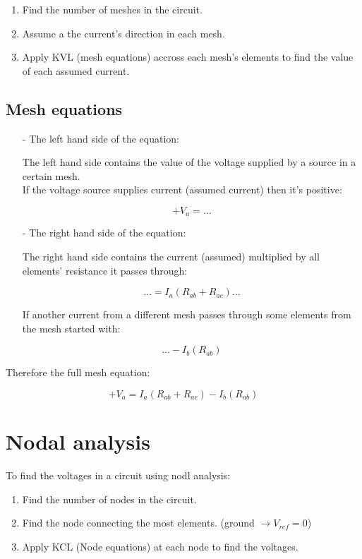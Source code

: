 \documentclass[a4paper]{book}
\begin{document}
\begin{enumerate}

  \item Find the number of meshes in the circuit.
  \item Assume a the current's direction in each mesh.
  \item Apply KVL (mesh equations) accross each mesh's elements to find the value of each assumed current.

\end{enumerate}

\subsection{Mesh equations}

\begin{itemize}

  \item[-] The left hand side of the equation:

    The left hand side contains the value of the voltage supplied by a source in a certain mesh.\\
    If the voltage source supplies current (assumed current) then it's positive:

    \[+V_a = \dots\]

  \item[-] The right hand side of the equation:

    The right hand side contains the current (assumed) multiplied by all elements' resistance it passes through:

    \[\ldots = I_a(R_{ab} + R_{ac}) \ldots\]

    If another current from a different mesh passes through some elements from the mesh started with:

    \[\ldots - I_b(R_{ab})\]

\end{itemize}

Therefore the full mesh equation:

\[+V_a = I_a(R_{ab} + R_{ac}) - I_b(R_{ab})\]


\section{Nodal analysis}

To find the voltages in a circuit using nodl analysis:

\begin{enumerate}

  \item Find the number of nodes in the circuit.
  \item Find the node connecting the most elements. (ground $\to V_{ref} = 0$)
  \item Apply KCL (Node equations) at each node to find the voltages.

\end{enumerate}
\end{document}
